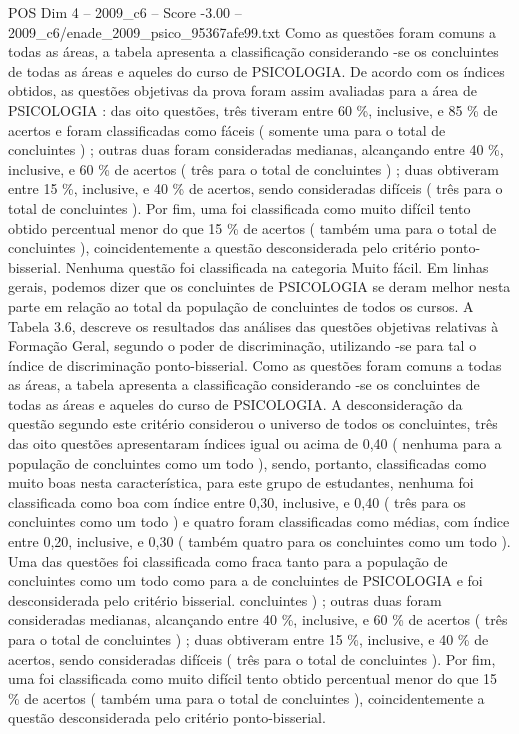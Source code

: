 \begin{textsample}{POS Dim 4 – 2009\_c6 – Score -3.00 – 2009\_c6/enade\_2009\_psico\_95367afe99.txt}
Como as questões foram comuns a todas as áreas, a tabela apresenta a classificação considerando -se os concluintes de todas as áreas e aqueles do curso de PSICOLOGIA.
De acordo com os índices obtidos, as questões objetivas da prova foram assim avaliadas para a área de PSICOLOGIA : das oito questões, três tiveram entre 60 \%, inclusive, e 85 \% de acertos e foram classificadas como fáceis ( somente uma para o total de concluintes ) ; outras duas foram consideradas medianas, alcançando entre 40 \%, inclusive, e 60 \% de acertos ( três para o total de concluintes ) ; duas obtiveram entre 15 \%, inclusive, e 40 \% de acertos, sendo consideradas difíceis ( três para o total de concluintes ).
Por fim, uma foi classificada como muito difícil tento obtido percentual menor do que 15 \% de acertos ( também uma para o total de concluintes ), coincidentemente a questão desconsiderada pelo critério ponto-bisserial.
Nenhuma questão foi classificada na categoria Muito fácil.
Em linhas gerais, podemos dizer que os concluintes de PSICOLOGIA se deram melhor nesta parte em relação ao total da população de concluintes de todos os cursos.
A Tabela 3.6, descreve os resultados das análises das questões objetivas relativas à Formação Geral, segundo o poder de discriminação, utilizando -se para tal o índice de discriminação ponto-bisserial.
Como as questões foram comuns a todas as áreas, a tabela apresenta a classificação considerando -se os concluintes de todas as áreas e aqueles do curso de PSICOLOGIA.
A desconsideração da questão segundo este critério considerou o universo de todos os concluintes, três das oito questões apresentaram índices igual ou acima de 0,40 ( nenhuma para a população de concluintes como um todo ), sendo, portanto, classificadas como muito boas nesta característica, para este grupo de estudantes, nenhuma foi classificada como boa com índice entre 0,30, inclusive, e 0,40 ( três para os concluintes como um todo ) e quatro foram classificadas como médias, com índice entre 0,20, inclusive, e 0,30 ( também quatro para os concluintes como um todo ).
Uma das questões foi classificada como fraca tanto para a população de concluintes como um todo como para a de concluintes de PSICOLOGIA e foi desconsiderada pelo critério bisserial. concluintes ) ; outras duas foram consideradas medianas, alcançando entre 40 \%, inclusive, e 60 \% de acertos ( três para o total de concluintes ) ; duas obtiveram entre 15 \%, inclusive, e 40 \% de acertos, sendo consideradas difíceis ( três para o total de concluintes ).
Por fim, uma foi classificada como muito difícil tento obtido percentual menor do que 15 \% de acertos ( também uma para o total de concluintes ), coincidentemente a questão desconsiderada pelo critério ponto-bisserial.

\end{textsample}
